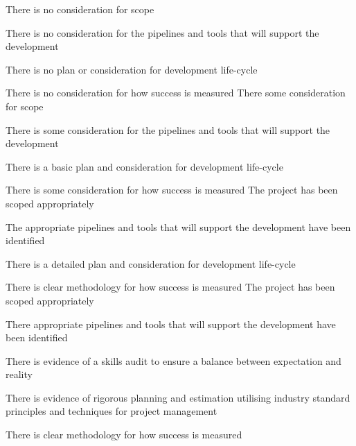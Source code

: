 \begin{markingrubric}
        \grade\fail 	There is no consideration for scope
            \par 		There is no consideration for the pipelines and tools that will support the development
            \par        There is no plan or consideration for development life-cycle
            \par        There is no consideration for how success is measured
        \grade 	There some consideration for scope
            \par 		There is some consideration for the pipelines and tools that will support the development
            \par        There is a basic plan and consideration for development life-cycle
            \par        There is some consideration for how success is measured
        \grade 	The project has been scoped appropriately
            \par 		The appropriate pipelines and tools that will support the development have been identified
            \par        There is a detailed plan and consideration for development life-cycle
            \par        There is clear methodology for how success is measured     
        \grade 	The project has been scoped appropriately
            \par 		There appropriate pipelines and tools that will support the development have been identified
            \par        There is evidence of a skills audit to ensure a balance between expectation and reality
            \par        There is evidence of rigorous planning and estimation utilising industry standard principles and techniques for project management
            \par        There is clear methodology for how success is measured          


\end{markingrubric}
